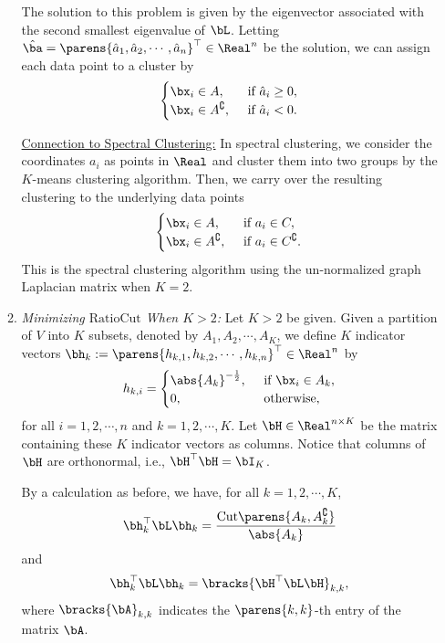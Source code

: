 \documentclass[12pt]{article}
\begin{document}
\begin{enumerate}[label=\textbf{\arabic*.}]
\begin{enumerate}
		The solution to this problem is given by the eigenvector associated with the second smallest eigenvalue of $\bL$. Letting $\hat{\ba} = \parens{\hat{a}_1, \hat{a}_2, \cdots, \hat{a}_n}^\top \in \Real^n$ be the solution, we can assign each data point to a cluster by 
		\begin{align}
			\begin{cases}
				\bx_i \in A, & \, \text{ if } \hat{a}_i \ge 0, \\ 
				\bx_i \in A^{\complement}, & \, \text{ if } \hat{a}_i < 0. 
			\end{cases}
		\end{align}
		
		\underline{Connection to Spectral Clustering:} In spectral clustering, we consider the coordinates $a_i$ as points in $\Real$ and cluster them into two groups by the $K$-means clustering algorithm. Then, we carry over the resulting clustering to the underlying data points 
		\begin{align*}
			\begin{cases}
				\bx_i \in A, & \, \text{ if } a_i \in C, \\ 
				\bx_i \in A^{\complement}, & \, \text{ if } a_i \in C^{\complement}. 
			\end{cases}
		\end{align*}
		This is the spectral clustering algorithm using the un-normalized graph Laplacian matrix when $K = 2$. 
		
		\item \textit{Minimizing $\mathrm{RatioCut}$ When $K > 2$:} Let $K > 2$ be given. Given a partition of $V$ into $K$ subsets, denoted by $A_1, A_2, \cdots, A_K$, we define $K$ indicator vectors $\bh_k := \parens{h_{k,1}, h_{k,2}, \cdots, h_{k,n}}^\top \in \Real^n$ by 
		\begin{align}\label{eq-ratiocut-k>2-h}
			h_{k, i} = \begin{cases}
			\abs{A_k}^{-\frac{1}{2}}, & \, \text{ if } \bx_i \in A_k, \\ 
			0, & \, \text{ otherwise}, 
			\end{cases}
		\end{align}
		for all $i = 1, 2, \cdots, n$ and $k = 1, 2, \cdots, K$. Let $\bH \in \Real^{n \times K}$ be the matrix containing these $K$ indicator vectors as columns. Notice that columns of $\bH$ are orthonormal, i.e., $\bH^\top \bH = \bI_K$. 
		
		By a calculation as before, we have, for all $k = 1, 2, \cdots, K$, 
		\begin{align*}
			\bh_k^\top \bL \bh_k = \frac{\mathrm{Cut} \parens{A_k, A_k^{\complement}}}{\abs{A_k}}
		\end{align*}
		and 
		\begin{align*}
			\bh_k^\top \bL \bh_k = \bracks{\bH^\top \bL \bH}_{k, k}, 
		\end{align*}
		where $\bracks{\bA}_{k, k}$ indicates the $\parens{k, k}$-th entry of the matrix $\bA$. 
		

\end{enumerate}
\end{enumerate}
\end{document}
